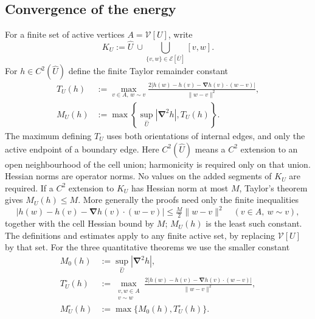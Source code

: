 \documentclass[12pt]{amsart}
\numberwithin{equation}{section}
\newcommand{\V}{\mathcal{V}}
\newcommand{\E}{\mathcal{E}}
\newcommand{\Cnabla}{\boldsymbol{\nabla}}
\begin{document}
\subsection{Convergence of the energy}
For a finite set of active vertices $A=\V[U]$, write
\[
 K_U:=\widehat U\ \cup\!\!\bigcup_{\{v,w\}\in\E[\overline U]}[v,w].
\]
For $h\in C^2(\widehat U)$ define the finite Taylor remainder constant
\begin{equation}\label{eq:taylor-constant}
 \begin{split}
 T_U(h)&:=\max_{v\in A,\,w\sim v}
 \frac{2|h(w)-h(v)-\Cnabla h(v)\cdot(w-v)|}{\|w-v\|^2},\\
 M_U(h)&:=\max\left\{\sup_{\widehat U}|\Cnabla^2h|,T_U(h)\right\}.
 \end{split}
\end{equation}
The maximum defining $T_U$ uses both orientations of internal edges, and only the active endpoint of a boundary edge. Here $C^2(\widehat U)$ means a $C^2$ extension to an open neighbourhood of the cell union; harmonicity is required only on that union. Hessian norms are operator norms. No values on the added segments of $K_U$ are required. If a $C^2$ extension to $K_U$ has Hessian norm at most $M$, Taylor's theorem gives $M_U(h)\leq M$. More generally the proofs need only the finite inequalities
\begin{equation}\label{eq:finite-taylor-condition}
 |h(w)-h(v)-\Cnabla h(v)\cdot(w-v)|\leq\tfrac M2\|w-v\|^2
 \quad(v\in A,\ w\sim v),
\end{equation}
together with the cell Hessian bound by $M$; $M_U(h)$ is the least such constant. The definitions and estimates apply to any finite active set, by replacing $\V[U]$ by that set.
For the three quantitative theorems we use the smaller constant
\begin{equation}\label{eq:internal-taylor-constant}
\begin{split}
 M_0(h)&:=\sup_{\widehat U}|\Cnabla^2h|,\\
 T_U^\circ(h)&:=\max_{\substack{v,w\in A\\v\sim w}}
 \frac{2|h(w)-h(v)-\Cnabla h(v)\cdot(w-v)|}{\|w-v\|^2},\\
 M_U^\circ(h)&:=\max\{M_0(h),T_U^\circ(h)\}.
\end{split}
\end{equation}
\end{document}
